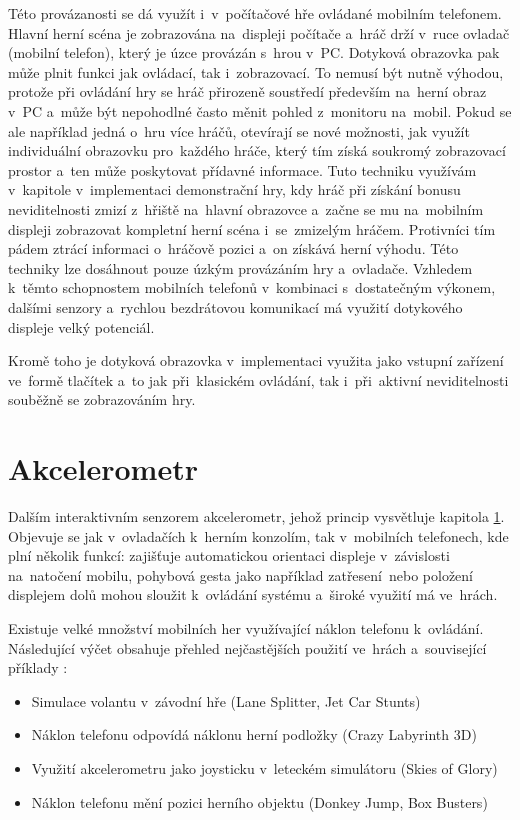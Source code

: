 \documentclass[thesis=B,czech,hidelinks]{FITthesis}[2012/06/26] %
\begin{document}
Této provázanosti se dá využít i~v~počítačové hře ovládané mobilním telefonem. Hlavní herní scéna je zobrazována na~displeji počítače a~hráč drží v~ruce ovladač (mobilní telefon), který je úzce provázán s~hrou v~PC. Dotyková obrazovka pak může plnit funkci jak ovládací, tak i~zobrazovací. To nemusí být nutně výhodou, protože při ovládání hry se hráč přirozeně soustředí především na~herní obraz v~PC a~může být nepohodlné často měnit pohled z~monitoru na~mobil. Pokud se ale například jedná o~hru více hráčů, otevírají se nové možnosti, jak využít individuální obrazovku pro~každého hráče, který tím získá soukromý zobrazovací prostor a~ten může poskytovat přídavné informace. Tuto techniku využívám v~kapitole \cite{chapter:implementation} v~implementaci demonstrační hry, kdy hráč při získání bonusu neviditelnosti zmizí z~hřiště na~hlavní obrazovce a~začne se mu na~mobilním displeji zobrazovat kompletní herní scéna i~se~zmizelým hráčem. Protivníci tím pádem ztrácí informaci o~hráčově pozici a~on získává herní výhodu. Této techniky lze dosáhnout pouze úzkým provázáním hry a~ovladače. Vzhledem k~těmto schopnostem mobilních telefonů v~kombinaci s~dostatečným výkonem, dalšími senzory a~rychlou bezdrátovou komunikací má využití dotykového displeje velký potenciál.

Kromě toho je dotyková obrazovka v~implementaci využita jako vstupní zařízení ve~formě tlačítek a~to jak při~klasickém ovládání, tak i~při~aktivní neviditelnosti souběžně se zobrazováním hry.

\section{Akcelerometr}
\label{section:accelerometer}

Dalším interaktivním senzorem akcelerometr, jehož princip vysvětluje kapitola \ref{section:accelerometer}. Objevuje se jak v~ovladačích k~herním konzolím, tak v~mobilních telefonech, kde plní několik funkcí: zajišťuje automatickou orientaci displeje v~závislosti na~natočení mobilu, pohybová gesta jako například zatřesení~nebo položení displejem dolů mohou sloužit k~ovládání systému a~široké využití má ve~hrách.

Existuje velké množství mobilních her využívající náklon telefonu k~ovládání. Následující výčet obsahuje přehled nejčastějších použití ve~hrách a~související příklady \cite{accelerometergames}:

\begin{itemize}
	\item Simulace volantu v~závodní hře (Lane Splitter, Jet Car Stunts)
	\item Náklon telefonu odpovídá náklonu herní podložky (Crazy Labyrinth 3D)
	\item Využití akcelerometru jako joysticku v~leteckém simulátoru (Skies of Glory)
	\item Náklon telefonu mění pozici herního objektu (Donkey Jump, Box Busters)
\end{itemize}
\end{document}
